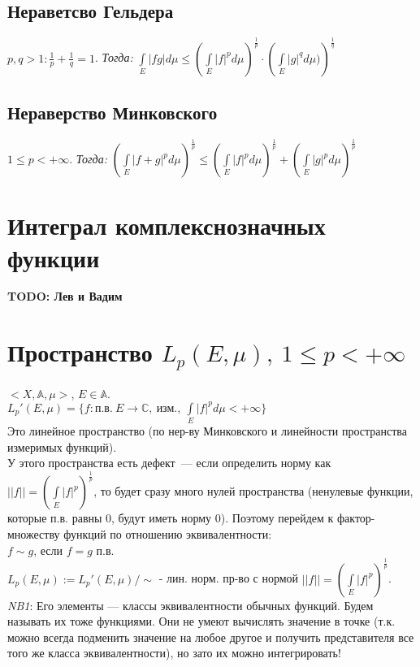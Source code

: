 \documentclass[paper=a4, fontsize=17pt]{article}
\begin{document}
	\subsection{Нераветсво Гельдера}
	$p, q > 1 : \frac{1}{p} + \frac{1}{q} = 1$.
	\emph{Тогда:}
	${\displaystyle \int\limits_E |fg|d\mu \leq \left(\int\limits_E |f|^p d\mu\right)^\frac{1}{p} \cdot \left(\int\limits_E |g|^q d\mu)\right)^\frac{1}{q}}$
	\subsection{Нераверство Минковского}
	$1 \leq p < +\infty$.
	\emph{Тогда:}
	${\displaystyle \left(\int\limits_E |f + g|^p d\mu \right)^\frac{1}{p}
		\leq \left(\int\limits_E |f|^p d\mu\right)^\frac{1}{p}
		+ \left(\int\limits_E |g|^p d\mu\right)^\frac{1}{p}}$

	\section{Интеграл комплекснозначных функции}
	{\color{red} \textbf{TODO: Лев и Вадим}}

	\section{Пространство $L_p(E,\mu),\ 1 \leq p < +\infty$}
	$<X, \mathds{A}, \mu>$, $E \in \mathds{A}$.\\
	$L_p'(E, \mu) = \{ f : \text{п.в.}\ E \rightarrow \mathbb{C},\ \text{изм.},\ \int\limits_E |f|^p d\mu < +\infty \}$\\
	Это линейное пространство (по нер-ву Минковского и линейности пространства измеримых функций).\\
	У этого пространства есть дефект~--- если определить норму как $||f|| = \left(\int\limits_E |f|^p\right)^\frac{1}{p}$, то будет сразу много нулей пространства (ненулевые функции, которые п.в. равны $0$, будут иметь норму $0$).
	Поэтому перейдем к фактор-множеству функций по отношению эквивалентности:\\
	$f \sim g$, если $f = g$ п.в.\\
	$ L_p(E, \mu) := L_p'(E, \mu) / \sim$ - лин. норм. пр-во с нормой $||f|| = \left(\int\limits_E |f|^p\right)^\frac{1}{p}$.\\

	\emph{NB1}: Его элементы --- классы эквивалентности обычных функций. Будем называть их тоже функциями. Они не умеют вычислять значение в точке (т.к. можно всегда подменить значение на любое другое и получить представителя все того же класса эквивалентности), но зато их можно интегрировать!\\
\end{document}
